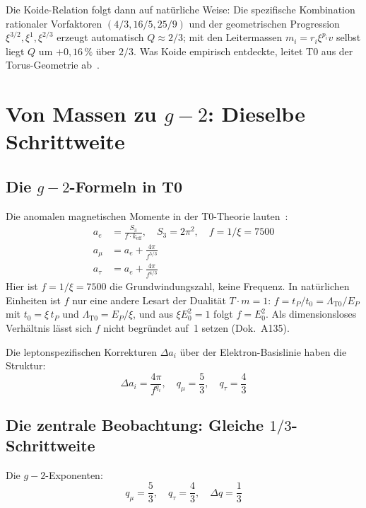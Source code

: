 Die Koide-Relation folgt dann auf natürliche Weise: Die spezifische Kombination rationaler Vorfaktoren $(4/3, 16/5, 25/9)$ und der geometrischen Progression $\xi^{3/2}, \xi^1, \xi^{2/3}$ erzeugt automatisch $Q \approx 2/3$; mit den Leitermassen $m_i = r_i\xi^{p_i}v$ selbst liegt $Q$ um $+0{,}16\,\%$ über $2/3$. Was Koide empirisch entdeckte, leitet T0 aus der Torus-Geometrie ab~\cite{Pascher116}.

\section{Von Massen zu $g-2$: Dieselbe Schrittweite}

\subsection{Die $g-2$-Formeln in T0}

Die anomalen magnetischen Momente in der T0-Theorie lauten~\cite{Pascher018}:
\begin{align}
	a_e &= \frac{S_3}{f \cdot k_\text{eff}}, \quad S_3 = 2\pi^2, \quad f = 1/\xi = 7500 \\
	a_\mu &= a_e + \frac{4\pi}{f^{5/3}} \\
	a_\tau &= a_e + \frac{4\pi}{f^{4/3}}
\end{align}
Hier ist $f = 1/\xi = 7500$ die Grundwindungszahl, keine Frequenz. In natürlichen Einheiten ist $f$ nur eine andere Lesart der Dualität $T\cdot m = 1$: $f = t_P/t_0 = \Lambda_{\text{T0}}/E_P$ mit $t_0 = \xi\,t_P$ und $\Lambda_{\text{T0}} = E_P/\xi$, und aus $\xi E_0^2 = 1$ folgt $f = E_0^2$. Als dimensionsloses Verhältnis lässt sich $f$ nicht begründet auf~1 setzen (Dok.~A135).

Die leptonspezifischen Korrekturen $\Delta a_i$ über der Elektron-Basislinie haben die Struktur:
\begin{equation}
	\Delta a_i = \frac{4\pi}{f^{q_i}}, \quad q_\mu = \frac{5}{3}, \quad q_\tau = \frac{4}{3}
	\label{eq:g2exponents}
\end{equation}

\subsection{Die zentrale Beobachtung: Gleiche $1/3$-Schrittweite}

Die $g-2$-Exponenten:
\begin{equation}
	q_\mu = \frac{5}{3}, \quad q_\tau = \frac{4}{3}, \quad \Delta q = \frac{1}{3}
\end{equation}

